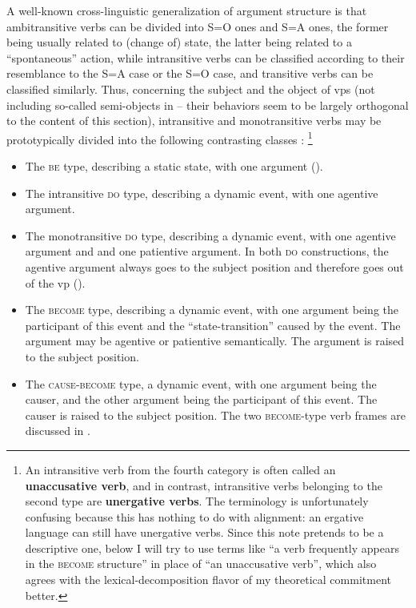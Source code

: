\documentclass[UTF8, a4paper, oneside, scheme=plain, 12pt]{ctexrep}
\newcommand*{\citechap}[1]{chap.~{#1}}
\newcommand*{\concept}[1]{\textbf{#1}}
\newcommand*{\category}[1]{\textsc{#1}}
\begin{document}
A well-known cross-linguistic generalization of argument structure 
is that ambitransitive verbs can be divided into S=O ones 
and S=A ones, 
the former being usually related to (change of) state, 
the latter being related to a ``spontaneous'' action, 
while intransitive verbs can be classified according to their 
resemblance to the S=A case or the S=O case, 
and transitive verbs can be classified similarly. 
Thus, concerning the subject and the object of \acs{vp}s 
(not including so-called semi-objects in 
-- their behaviors seem to be largely orthogonal to the content of this section), 
intransitive and monotransitive verbs
may be prototypically divided into the following contrasting classes 
\citep[\citechap{6}]{deng2010formal}:%
\footnote{
    An intransitive verb from the fourth category
    is often called an \concept{unaccusative verb}, 
    and in contrast, 
    intransitive verbs belonging to the second type 
    are \concept{unergative verbs}.
    The terminology is unfortunately confusing
    because this has nothing to do with alignment:
    an ergative language can still have unergative verbs.
    Since this note pretends to be a descriptive one, 
    below I will try to use terms like ``a verb frequently appears in the \category{become} structure''
    in place of ``an unaccusative verb'',
    which also agrees with the lexical-decomposition flavor of 
    my theoretical commitment better. 
}
\begin{itemize}
    \item The \category{be} type, describing a static state, with one argument
    ().
    \item The intransitive \category{do} type, describing a dynamic event, with one agentive argument.
    \item The monotransitive \category{do} type, describing a dynamic event,  
        with one agentive argument and 
        and one patientive argument.
        In both \category{do} constructions, 
        the agentive argument always goes to the subject position 
        and therefore goes out of the \acs{vp}
        ().
    \item The \category{become} type, describing a dynamic event, 
        with one argument being the participant of this event 
        and the ``state-transition'' caused by the event. 
        The argument may be agentive or patientive semantically.
        The argument is raised to the subject position.
    \item The \category{cause-become} type, a dynamic event, 
        with one argument being the causer, 
        and the other argument being the participant of this event.
        The causer is raised to the subject position.
        The two \category{become}-type verb frames 
        are discussed in .
\end{itemize}
\end{document}
